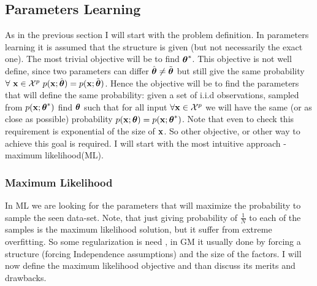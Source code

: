 \subsection{Parameters Learning}
As in the previous section I will start with the problem definition. 
In parameters learning it is assumed that the structure is given (but not necessarily the exact one). The most trivial objective will be to find ${\boldsymbol{\theta}}^{*}$.  
This  objective is not well define,  since two parameters can differ $\hat{\boldsymbol{\theta}} \neq \tilde{\boldsymbol{\theta}}$ but still give the same probability $\forall\ {\bf x} \in {\cal X}^p\ p({\bf x};\hat{\boldsymbol{\theta}}) = p({\bf x};\tilde{\boldsymbol{\theta}})$.
Hence the objective will be to find the parameters that will define the same probability: given a set of i.i.d observations, sampled from $p({\bf x};{\boldsymbol{\theta}}^{*})$ find $\boldsymbol{\theta}$ such that for all input $\forall {\bf x} \in {\cal X}^{p}$ we will have the same (or as close as possible) probability $p({\bf x};\boldsymbol{\theta}) = p({\bf x};{\boldsymbol{\theta}}^{*})$.
Note that even to check this requirement is exponential of the size of ${\bf x}$.
So other objective, or other way to achieve this goal is required.
I will start with the  most intuitive approach - maximum likelihood(ML).

\subsubsection{Maximum Likelihood}
\label{sec:max_likelihood}
In ML we are looking for the parameters that will maximize the probability to sample the seen data-set.
Note, that just giving probability of $\frac{1}{N}$ to each of the samples is the maximum likelihood solution, but it suffer from extreme overfitting.
So some regularization is need , in GM it usually done by forcing a structure (forcing Independence assumptions) and the size of the factors.
I will now define the maximum likelihood objective and than discuss its merits and drawbacks.

